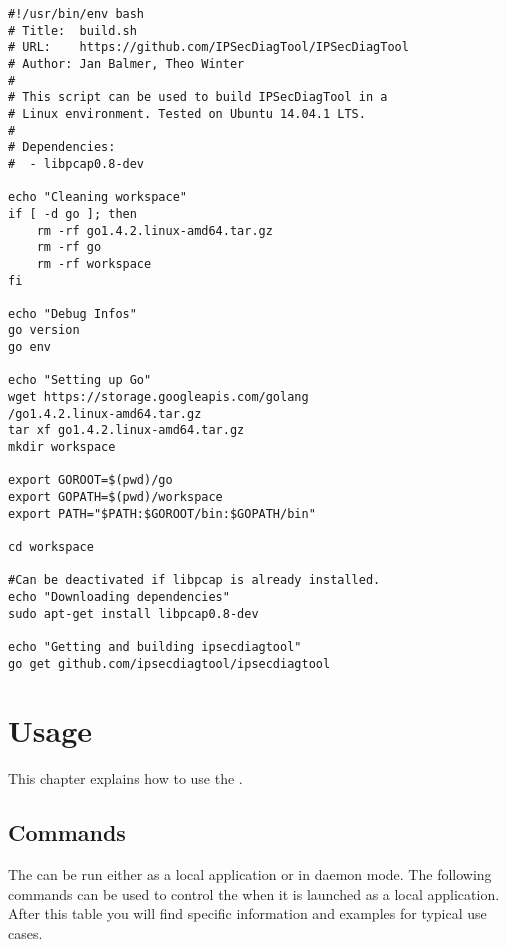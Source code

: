 \lstset{language=bash, breaklines=true}
\begin{lstlisting}
#!/usr/bin/env bash
# Title:  build.sh                                       
# URL:    https://github.com/IPSecDiagTool/IPSecDiagTool
# Author: Jan Balmer, Theo Winter
#    
# This script can be used to build IPSecDiagTool in a
# Linux environment. Tested on Ubuntu 14.04.1 LTS.
#
# Dependencies:
#  - libpcap0.8-dev

echo "Cleaning workspace"
if [ -d go ]; then
	rm -rf go1.4.2.linux-amd64.tar.gz
	rm -rf go
    rm -rf workspace
fi

echo "Debug Infos"
go version
go env

echo "Setting up Go"
wget https://storage.googleapis.com/golang
/go1.4.2.linux-amd64.tar.gz
tar xf go1.4.2.linux-amd64.tar.gz
mkdir workspace

export GOROOT=$(pwd)/go
export GOPATH=$(pwd)/workspace
export PATH="$PATH:$GOROOT/bin:$GOPATH/bin"

cd workspace

#Can be deactivated if libpcap is already installed.
echo "Downloading dependencies"
sudo apt-get install libpcap0.8-dev

echo "Getting and building ipsecdiagtool"
go get github.com/ipsecdiagtool/ipsecdiagtool
\end{lstlisting}


\section{Usage}
This chapter explains how to use the \entool{}.

\subsection{Commands}
The \entool{} can be run either as a local application or in daemon mode. The following commands can be used to control the \entool{} when it is launched as a local application. After this table you will find specific information and examples for typical use cases.

